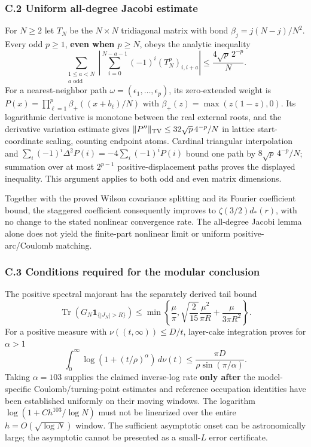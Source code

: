 \documentclass[
  10pt,
  a4paper,
]{article}
\begin{document}
\subsubsection{C.2 Uniform all-degree Jacobi estimate}\label{c.2-uniform-all-degree-jacobi-estimate}

For \(N\ge2\) let \(T_N\) be the \(N\times N\) tridiagonal matrix with bond \(\beta_j=j(N-j)/N^2\). Every odd \(p\ge1\), \textbf{even when \(p\ge N\)}, obeys the analytic inequality \[ \boxed{\sum_{\substack{1\le a<N\\a\text{ odd}}}\left|\sum_{i=0}^{N-a-1}(-1)^i(T_N^p)_{i,i+a}\right|\le\frac{4\sqrt p\,2^{-p}}N.} \] For a nearest-neighbor path \(\omega=(\epsilon_1,\ldots,\epsilon_p)\), its zero-extended weight is \(P(x)=\prod_{\ell=1}^p\beta_+((x+b_\ell)/N)\) with \(\beta_+(z)=\max(z(1-z),0)\). Its logarithmic derivative is monotone between the real external roots, and the derivative variation estimate gives \(\|P''\|_{\rm TV}\le 32\sqrt p\,4^{-p}/N\) in lattice start-coordinate scaling, counting endpoint atoms. Cardinal triangular interpolation and \(\sum_i(-1)^i\Delta^2P(i)=-4\sum_i(-1)^iP(i)\) bound one path by \(8\sqrt p\,4^{-p}/N\); summation over at most \(2^{p-1}\) positive-displacement paths proves the displayed inequality. This argument applies to both odd and even matrix dimensions.

Together with the proved Wilson covariance splitting and its Fourier coefficient bound, the staggered coefficient consequently improves to \(\zeta(3/2)d_*(r)\), with no change to the stated nonlinear convergence rate. The all-degree Jacobi lemma alone does not yield the finite-part nonlinear limit or uniform positive-arc/Coulomb matching.

\subsubsection{C.3 Conditions required for the modular conclusion}\label{c.3-conditions-required-for-the-modular-conclusion}

The positive spectral majorant has the separately derived tail bound \[ \operatorname{Tr}(G_N\mathbf1_{\{|J_N|>R\}})\le\min\left\{\frac\mu\pi,\sqrt{\frac2{15}}\frac{\mu^2}{\pi R}+\frac\mu{3\pi R^2}\right\}. \] For a positive measure with \(\nu((t,\infty))\le D/t\), layer-cake integration proves for \(\alpha>1\) \[ \int_0^\infty\log(1+(t/\rho)^\alpha)\,d\nu(t)\le\frac{\pi D}{\rho\sin(\pi/\alpha)}. \] Taking \(\alpha=103\) supplies the claimed inverse-log rate \textbf{only after} the model-specific Coulomb/turning-point estimates and reference occupation identities have been established uniformly on their moving windows. The logarithm \(\log(1+Ch^{103}/\log N)\) must not be linearized over the entire \(h=O(\sqrt{\log N})\) window. The sufficient asymptotic onset can be astronomically large; the asymptotic cannot be presented as a small-\(L\) error certificate.
\end{document}
